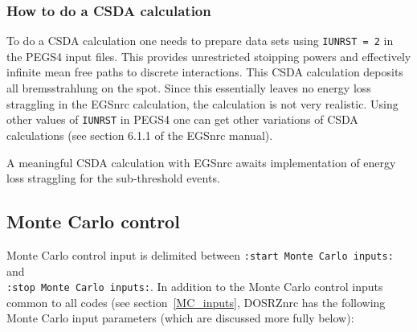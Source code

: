 \documentclass[12pt,twoside]{article}  %
\begin{document}
\subsubsection{How to do a CSDA calculation}

To do a CSDA calculation one needs to prepare data sets using {\tt IUNRST =
2} in the PEGS4 input files.  This provides unrestricted stoipping powers
and effectively infinite mean free paths to discrete interactions.  This
CSDA calculation deposits all bremsstrahlung on the spot.  Since this
essentially leaves no energy loss straggling in the EGSnrc calculation, the
calculation is not very realistic.  Using other values of {\tt IUNRST} in
PEGS4 one can get other variations of CSDA calculations (see section 6.1.1
of the EGSnrc manual).

A meaningful CSDA calculation with EGSnrc awaits implementation of energy
loss straggling for the sub-threshold events.




\subsection{Monte Carlo control}

Monte Carlo control input is delimited between
\verb+:start Monte Carlo inputs:+ and \\
\verb+:stop Monte Carlo inputs:+.  In addition to the Monte Carlo control
inputs common to all codes (see section~\ref{MC_inputs}, DOSRZnrc has the
following Monte Carlo input parameters
(which are discussed more fully below):
\end{document}
